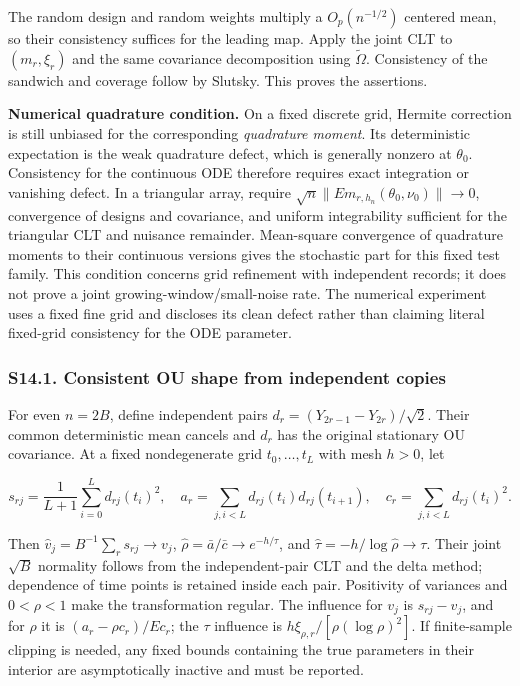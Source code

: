 \documentclass[
  american,
  11pt,
]{article}
\begin{document}
The random design and random weights multiply a \(O_p(n^{-1/2})\)
centered mean, so their consistency suffices for the leading map. Apply
the joint CLT to \((m_r,\xi_r)\) and the same covariance decomposition
using \(\widetilde\Omega\). Consistency of the sandwich and coverage
follow by Slutsky. This proves the assertions.

\textbf{Numerical quadrature condition.} On a fixed discrete grid,
Hermite correction is still unbiased for the corresponding
\emph{quadrature moment}. Its deterministic expectation is the weak
quadrature defect, which is generally nonzero at \(\theta_0\).
Consistency for the continuous ODE therefore requires exact integration
or vanishing defect. In a triangular array, require
\(\sqrt n\|E m_{r,h_n}(\theta_0,\nu_0)\|\to0\), convergence of designs
and covariance, and uniform integrability sufficient for the triangular
CLT and nuisance remainder. Mean-square convergence of quadrature
moments to their continuous versions gives the stochastic part for this
fixed test family. This condition concerns grid refinement with
independent records; it does not prove a joint
growing-window/small-noise rate. The numerical experiment uses a fixed
fine grid and discloses its clean defect rather than claiming literal
fixed-grid consistency for the ODE parameter.

\subsubsection{S14.1. Consistent OU shape from independent
copies}\label{s14.1.-consistent-ou-shape-from-independent-copies}

For even \(n=2B\), define independent pairs
\(d_r=(Y_{2r-1}-Y_{2r})/\sqrt2\). Their common deterministic mean
cancels and \(d_r\) has the original stationary OU covariance. At a
fixed nondegenerate grid \(t_0,\ldots,t_L\) with mesh \(h>0\), let

\[
s_{rj}=\frac1{L+1}\sum_{i=0}^L d_{rj}(t_i)^2,
\quad a_r=\sum_{j,i<L}d_{rj}(t_i)d_{rj}(t_{i+1}),
\quad c_r=\sum_{j,i<L}d_{rj}(t_i)^2.
\]

Then \(\widehat v_j=B^{-1}\sum_r s_{rj}\to v_j\),
\(\widehat\rho=\bar a/\bar c\to e^{-h/\tau}\), and
\(\widehat\tau=-h/\log\widehat\rho\to\tau\). Their joint \(\sqrt B\)
normality follows from the independent-pair CLT and the delta method;
dependence of time points is retained inside each pair. Positivity of
variances and \(0<\rho<1\) make the transformation regular. The
influence for \(v_j\) is \(s_{rj}-v_j\), and for \(\rho\) it is
\((a_r-\rho c_r)/E c_r\); the \(\tau\) influence is
\(h\xi_{\rho,r}/[\rho(\log\rho)^2]\). If finite-sample clipping is
needed, any fixed bounds containing the true parameters in their
interior are asymptotically inactive and must be reported.
\end{document}
